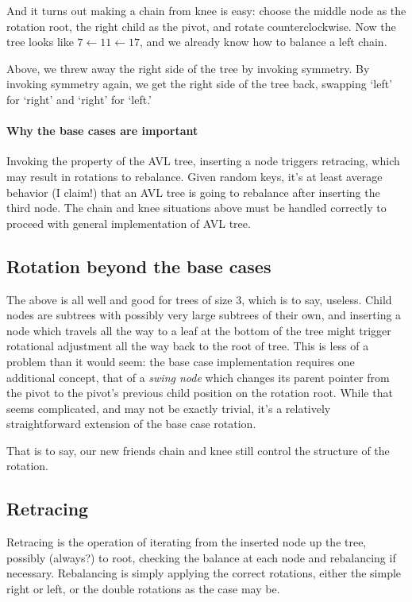And it turns out making a chain from knee is easy: choose the middle
node as the rotation root, the right child as the pivot, and rotate
counterclockwise. Now the tree looks like $7 \leftarrow 11\leftarrow 17$, and we
already know how to balance a left chain.

Above, we threw away the right side of the tree by invoking symmetry.
By invoking symmetry again, we get the right side of the tree back,
swapping `left' for `right' and `right' for `left.'


\paragraph{Why the base cases are important}
Invoking the property of the AVL tree, inserting a node triggers retracing,
which may result in rotations to rebalance.  Given random keys, it's
at least average behavior (I claim!) that an AVL tree is going to rebalance after
inserting the third node. The chain and knee situations above must be handled
correctly to proceed with general implementation of AVL tree.


\subsection{Rotation beyond the base cases}

The above is all well and good for trees of size 3, which is to say, useless.
Child nodes are subtrees with possibly very large subtrees of their own,
and inserting a node which travels all the way to a leaf at the bottom
of the tree might trigger rotational adjustment all the way back to the
root of tree. This is less of a problem than it would seem: the base
case implementation requires one additional concept, that of a
\textit{swing node} which changes its parent pointer from the pivot to
the pivot's previous child position on the rotation root. While that
seems complicated, and may not be exactly trivial, it's a relatively
straightforward extension of the base case rotation.

That is to say, our new friends chain and knee still control the structure
of the rotation.


\subsection{Retracing}

Retracing is the operation of iterating from the inserted
node up the tree, possibly (always?) to root, checking
the balance at each node and rebalancing if necessary.
Rebalancing is simply applying the correct rotations,
either the simple right or left, or the double rotations
as the case may be.

